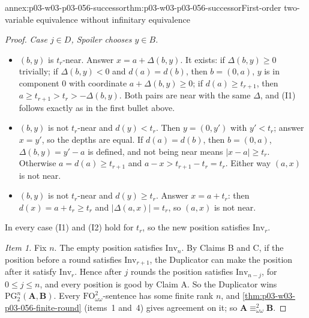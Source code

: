 \begin{annexitem}{annex:p03-w03-p03-056-successor}{thm:p03-w03-p03-056-successor}{First-order two-variable equivalence without infinitary equivalence}
\begin{proof}
\emph{Case \(j\in D\), Spoiler chooses \(y\in B\).}
\begin{itemize}
\item \((b,y)\) is \(t_r\)-near. Answer \(x=a+\Delta(b,y)\). It exists: if
      \(\Delta(b,y)\geq0\) trivially; if \(\Delta(b,y)<0\) and
      \(d(a)=d(b)\), then \(b=(0,a)\), \(y\) is in component \(0\) with
      coordinate \(a+\Delta(b,y)\geq0\); if \(d(a)\geq t_{r+1}\), then
      \(a\geq t_{r+1}>t_r>-\Delta(b,y)\). Both pairs are near with the same
      \(\Delta\), and (I1) follows exactly as in the first bullet above.
\item \((b,y)\) is not \(t_r\)-near and \(d(y)<t_r\). Then \(y=(0,y')\) with
      \(y'<t_r\); answer \(x=y'\), so the depths are equal. If
      \(d(a)=d(b)\), then \(b=(0,a)\), \(\Delta(b,y)=y'-a\) is defined, and
      not being near means \(\lvert x-a\rvert\geq t_r\). Otherwise
      \(a=d(a)\geq t_{r+1}\) and \(a-x>t_{r+1}-t_r=t_r\). Either way
      \((a,x)\) is not near.
\item \((b,y)\) is not \(t_r\)-near and \(d(y)\geq t_r\). Answer
      \(x=a+t_r\): then \(d(x)=a+t_r\geq t_r\) and
      \(\lvert\Delta(a,x)\rvert=t_r\), so \((a,x)\) is not near.
\end{itemize}
In every case (I1) and (I2) hold for \(t_r\), so the new position satisfies
\(\mathrm{Inv}_r\).

\emph{Item 1.} Fix \(n\). The empty position satisfies \(\mathrm{Inv}_n\).
By Claims B and C, if the position before a round satisfies
\(\mathrm{Inv}_{r+1}\), the Duplicator can make the position after it
satisfy \(\mathrm{Inv}_r\). Hence after \(j\) rounds the position satisfies
\(\mathrm{Inv}_{n-j}\), for \(0\leq j\leq n\), and every position is good by
Claim A. So the Duplicator wins \(\mathrm{PG}^n_2(\mathbf A,\mathbf B)\). Every
\(\mathrm{FO}^2_{\omega\omega}\)-sentence has some finite rank \(n\), and
\cref{thm:p03-w03-p03-056-finite-round} (items~1 and~4) gives agreement on
it; so \(\mathbf A\equiv^2_{\omega\omega}\mathbf B\).


\end{proof}
\end{annexitem}
